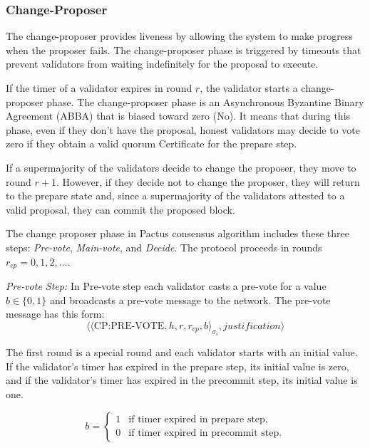 \documentclass{novel}
\begin{document}
\subsubsection{Change-Proposer}
The change-proposer provides liveness by allowing the system to make progress when the proposer fails. The change-proposer phase is triggered by timeouts that prevent validators from waiting indefinitely for the proposal to execute.

If the timer of a validator expires in round $r$, the validator starts a change-proposer phase. The change-proposer phase is an Asynchronous Byzantine Binary Agreement (ABBA) that is biased toward zero (No). It means that during this phase, even if they don’t have the proposal, honest validators may decide to vote zero if they obtain a valid quorum Certificate for the prepare step.

If a supermajority of the validators decide to change the proposer, they move to round $r+1$. However, if they decide not to change the proposer, they will return to the prepare state and, since a supermajority of the validators attested to a valid proposal, they can commit the proposed block.

The change proposer phase in Pactus consensus algorithm includes these three steps: \emph{Pre-vote}, \emph{Main-vote}, and \emph{Decide}. The protocol proceeds in rounds $r_{cp} = 0, 1, 2, \ldots$.

\noindent \emph{Pre-vote Step:} In Pre-vote step each validator casts a pre-vote for a value $b \in \{0, 1\}$ and broadcasts a pre-vote message to the network. The pre-vote message has this form:
\begin{equation*}
  \langle\langle \text{CP:PRE-VOTE},h,r,r_{cp},b \rangle_{\sigma_i}, justification\rangle
\end{equation*}

The first round is a special round and each validator starts with an initial value. If the validator’s timer has expired in the prepare step, its initial value is zero, and if the validator’s timer has expired in the precommit step, its initial value is one.

\begin{equation}
  b = \begin{cases}
        1 & \text{if timer expired in prepare step,} \\
        0 & \text{if timer expired in precommit step.}
      \end{cases}
\end{equation}
\end{document}
